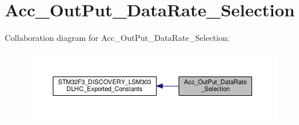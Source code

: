 \hypertarget{group__Acc__OutPut__DataRate__Selection}{\section{Acc\+\_\+\+Out\+Put\+\_\+\+Data\+Rate\+\_\+\+Selection}
\label{group__Acc__OutPut__DataRate__Selection}
}
Collaboration diagram for Acc\+\_\+\+Out\+Put\+\_\+\+Data\+Rate\+\_\+\+Selection\+:\nopagebreak
\begin{figure}[H]
\begin{center}
\leavevmode
\includegraphics[width=350pt]{group__Acc__OutPut__DataRate__Selection}
\end{center}
\end{figure}
